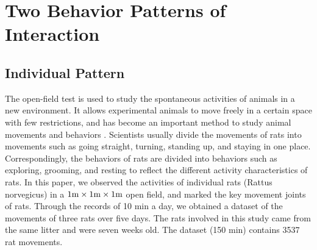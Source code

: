 \section{Two Behavior Patterns of Interaction}
\subsection{Individual Pattern}
The open-field test is used to study the spontaneous activities of animals in a new environment. It allows experimental animals to move freely in a certain space with few restrictions, and has become an important method to study animal movements and behaviors \cite{PRUT20033, EILAM200353}. Scientists usually divide the movements of rats into movements such as going straight, turning, standing up, and staying in one place. Correspondingly, the behaviors of rats are divided into behaviors such as exploring, grooming, and resting to reflect the different activity characteristics of rats\cite{the_rat_study,whishow_bejavior,MARSHALL2021420,dunn_profiling}. In this paper, we observed the activities of individual rats (Rattus norvegicus) in a $1{\rm m}\times 1{\rm m}\times 1{\rm m}$ open field, and marked the key movement joints of rats. Through the records of 10 min a day, we obtained a dataset of the movements of three rats over five days. The rats involved in this study came from the same litter and were seven weeks old. The dataset (150 min) contains 3537 rat movements.

